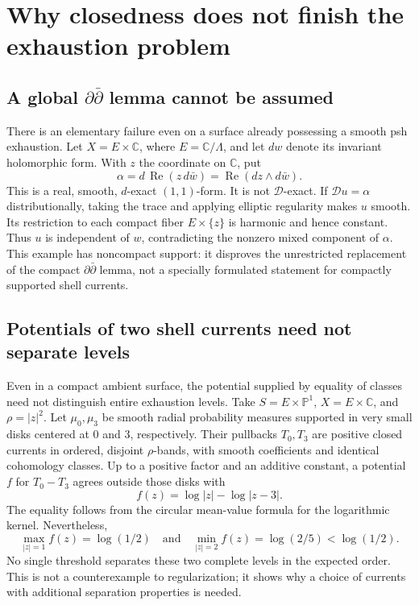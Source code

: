 \documentclass[11pt]{article}
\theoremstyle{remark}
\newcommand{\D}{\mathcal D}
\begin{document}
\section{Why closedness does not finish the exhaustion problem}
\subsection*{A global $\partial\bar\partial$ lemma cannot be assumed}
There is an elementary failure even on a surface already possessing a smooth psh exhaustion. Let
$X=E\times\mathbb C$, where $E=\mathbb C/\Lambda$, and let $dw$ denote its invariant holomorphic form. With $z$ the coordinate on $\mathbb C$, put
\[
 \alpha=d\,\operatorname{Re}(z\,d\bar w)
        =\operatorname{Re}(dz\wedge d\bar w).
\]
This is a real, smooth, $d$-exact $(1,1)$-form. It is not $\D$-exact. If $\D u=\alpha$ distributionally, taking the trace and applying elliptic regularity makes $u$ smooth. Its restriction to each compact fiber $E\times\{z\}$ is harmonic and hence constant. Thus $u$ is independent of $w$, contradicting the nonzero mixed component of $\alpha$.
This example has noncompact support: it disproves the unrestricted replacement of the compact $\partial\bar\partial$ lemma, not a specially formulated statement for compactly supported shell currents.

\subsection*{Potentials of two shell currents need not separate levels}
Even in a compact ambient surface, the potential supplied by equality of classes need not distinguish entire exhaustion levels. Take $S=E\times\mathbb P^1$, $X=E\times\mathbb C$, and $\rho=|z|^2$.
Let $\mu_0,\mu_3$ be smooth radial probability measures supported in very small disks centered at $0$ and $3$, respectively. Their pullbacks $T_0,T_3$ are positive closed currents in ordered, disjoint $\rho$-bands, with smooth coefficients and identical cohomology classes.
Up to a positive factor and an additive constant, a potential $f$ for $T_0-T_3$ agrees outside those disks with
\[
 f(z)=\log|z|-\log|z-3|.
\]
The equality follows from the circular mean-value formula for the logarithmic kernel. Nevertheless,
\[
 \max_{|z|=1}f(z)=\log(1/2)
 \quad\text{and}\quad
 \min_{|z|=2}f(z)=\log(2/5)<\log(1/2).
\]
No single threshold separates these two complete levels in the expected order. This is not a counterexample to regularization; it shows why a choice of currents with additional separation properties is needed.
\end{document}

